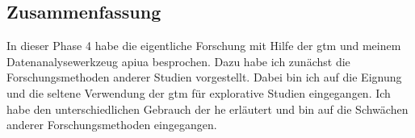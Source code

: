 \subsection{Zusammenfassung}

In dieser Phase 4 habe die eigentliche Forschung mit Hilfe der \gls{gtm} und meinem Datenanalysewerkzeug \gls{apiua} besprochen. Dazu habe ich zunächst die Forschungsmethoden anderer Studien vorgestellt. Dabei bin ich auf die Eignung und die seltene Verwendung der \gls{gtm} für explorative Studien eingegangen. Ich habe den unterschiedlichen Gebrauch der \gls{he} erläutert und bin auf die Schwächen anderer Forschungsmethoden eingegangen.

